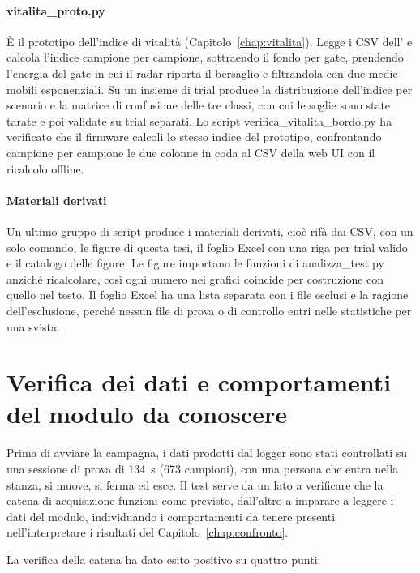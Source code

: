 \paragraph{vitalita\_proto.py}

È il prototipo dell'indice di vitalità (Capitolo~\ref{chap:vitalita}). Legge i CSV dell'\ldb{} e calcola l'indice campione per campione, sottraendo il fondo per gate, prendendo l'energia del gate in cui il radar riporta il bersaglio e filtrandola con due medie mobili esponenziali. Su un insieme di trial produce la distribuzione dell'indice per scenario e la matrice di confusione delle tre classi, con cui le soglie sono state tarate e poi validate su trial separati. Lo script verifica\_vitalita\_bordo.py ha verificato che il firmware calcoli lo stesso indice del prototipo, confrontando campione per campione le due colonne in coda al CSV della web UI con il ricalcolo offline.

\paragraph{Materiali derivati}

Un ultimo gruppo di script produce i materiali derivati, cioè rifà dai CSV, con un solo comando, le figure di questa tesi, il foglio Excel con una riga per trial valido e il catalogo delle figure. Le figure importano le funzioni di analizza\_test.py anziché ricalcolare, così ogni numero nei grafici coincide per costruzione con quello nel testo. Il foglio Excel ha una lista separata con i file esclusi e la ragione dell'esclusione, perché nessun file di prova o di controllo entri nelle statistiche per una svista.

\FloatBarrier
\section{Verifica dei dati e comportamenti del modulo da conoscere}
\label{sec:c3-5}

Prima di avviare la campagna, i dati prodotti dal logger sono stati controllati su una sessione di prova di 134~s (673 campioni), con una persona che entra nella stanza, si muove, si ferma ed esce. Il test serve da un lato a verificare che la catena di acquisizione funzioni come previsto, dall'altro a imparare a leggere i dati del modulo, individuando i comportamenti da tenere presenti nell'interpretare i risultati del Capitolo~\ref{chap:confronto}.

La verifica della catena ha dato esito positivo su quattro punti:

